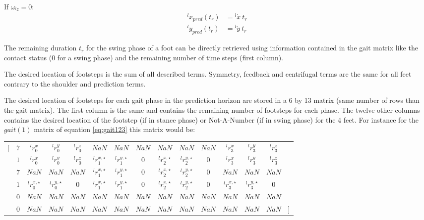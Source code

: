 \documentclass[a4paper,11pt]{article}
\begin{document}
If $\omega_{{}^l\!z} = 0$:
\begin{align}
{}^l\!x_{pred}(t_r) &= {}^l\!\dot x ~ t_r \\
{}^l\!y_{pred}(t_r) &= {}^l\!\dot y ~ t_r
\end{align}

The remaining duration $t_r$ for the swing phase of a foot can be directly retrieved using information contained in the gait matrix like the contact status (0 for a swing phase) and the remaining number of time steps (first column).

The desired location of footsteps is the sum of all described terms. Symmetry, feedback and centrifugal terms are the same for all feet contrary to the shoulder and prediction terms.

The desired location of footsteps for each gait phase in the prediction horizon are stored in a 6 by 13 matrix (same number of rows than the gait matrix). The first column is the same and contains the remaining number of footsteps for each phase. The twelve other columns contains the desired location of the footstep (if in stance phase) or Not-A-Number (if in swing phase) for the 4 feet. For instance for the $gait(1)$ matrix of equation \ref{eq:gait123} this matrix would be: \vspace{-0.6cm}

\begin{center}
\begin{tabular}{ccccccccccccccc}
	[ & $7$ & ${}^l\!r_0^x$ & ${}^l\!r_0^y$ & ${}^l\!r_0^z$ & $\mathit{NaN}$ & $\mathit{NaN}$ & $\mathit{NaN}$ & $\mathit{NaN}$ & $\mathit{NaN}$ & $\mathit{NaN}$ & ${}^l\!r_3^x$ & ${}^l\!r_3^y$ & ${}^l\!r_3^z$ & \\
	  & $1$ & ${}^l\!r_0^x$ & ${}^l\!r_0^y$ & ${}^l\!r_0^z$ & ${}^l\!r_1^{x,\star}$ & ${}^l\!r_1^{y,\star}$ & 0 & ${}^l\!r_2^{x,\star}$ & ${}^l\!r_2^{y,\star}$ & 0 & ${}^l\!r_3^x$ & ${}^l\!r_3^y$ & ${}^l\!r_3^z$ & \\
	   & $7$ & $\mathit{NaN}$ & $\mathit{NaN}$ & $\mathit{NaN}$ & ${}^l\!r_1^{x,\star}$ & ${}^l\!r_1^{y,\star}$ & 0 & ${}^l\!r_2^{x,\star}$ & ${}^l\!r_2^{y,\star}$ & 0 & $\mathit{NaN}$ & $\mathit{NaN}$ & $\mathit{NaN}$ & \\
	& $1$ & ${}^l\!r_0^{x,\star}$ & ${}^l\!r_0^{y,\star}$ & 0 & ${}^l\!r_1^{x,\star}$ & ${}^l\!r_1^{y,\star}$ & 0 & ${}^l\!r_2^{x,\star}$ & ${}^l\!r_2^{y,\star}$ & 0 & ${}^l\!r_3^{x,\star}$ & ${}^l\!r_3^{y,\star}$ & 0 & \\
	& 0 & $\mathit{NaN}$ & $\mathit{NaN}$ & $\mathit{NaN}$ & $\mathit{NaN}$ & $\mathit{NaN}$ & $\mathit{NaN}$ & $\mathit{NaN}$ & $\mathit{NaN}$ & $\mathit{NaN}$ & $\mathit{NaN}$ & $\mathit{NaN}$ & $\mathit{NaN}$ & \\
	& 0 & $\mathit{NaN}$ & $\mathit{NaN}$ & $\mathit{NaN}$ & $\mathit{NaN}$ & $\mathit{NaN}$ & $\mathit{NaN}$ & $\mathit{NaN}$ & $\mathit{NaN}$ & $\mathit{NaN}$ & $\mathit{NaN}$ & $\mathit{NaN}$ & $\mathit{NaN}$ & ]    
\end{tabular}
\end{center}
\end{document}
